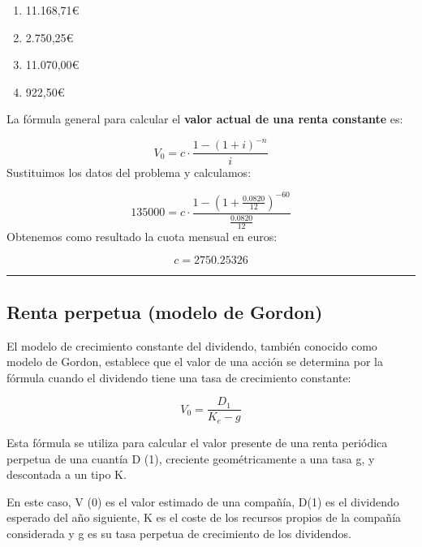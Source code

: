 \documentclass[
  letterpaper,
  DIV=11,
  numbers=noendperiod]{scrreprt}
\begin{document}
\begin{tcolorbox}
\begin{enumerate}
\def\labelenumi{\alph{enumi}.}
\item
  11.168,71€
\item
  2.750,25€
\item
  11.070,00€
\item
  922,50€
\end{enumerate}

\begin{tcolorbox}[enhanced jigsaw, toprule=.15mm, left=2mm, breakable, opacitybacktitle=0.6, toptitle=1mm, coltitle=black, arc=.35mm, leftrule=.75mm, bottomtitle=1mm, titlerule=0mm, title=\textcolor{quarto-callout-tip-color}{\faLightbulb}\hspace{0.5em}{Solución}, rightrule=.15mm, opacityback=0, bottomrule=.15mm, colback=white, colframe=quarto-callout-tip-color-frame, colbacktitle=quarto-callout-tip-color!10!white]

La fórmula general para calcular el \textbf{valor actual de una renta
constante} es:

\[V_0=c\cdot\frac{1-\left(1+i\right)^{-n}}{i}\] Sustituimos los datos
del problema y calculamos:

\[135000=c\cdot \frac{1-\left(1+\frac{0.0820}{12}\right)^{-60}}{\frac{0.0820}{12}}\]
Obtenemos como resultado la cuota mensual en euros:

\[c=2750.25326\]

\end{tcolorbox}

\begin{center}\rule{0.5\linewidth}{0.5pt}\end{center}

\subsection{Renta perpetua (modelo de
Gordon)}\label{renta-perpetua-modelo-de-gordon-1}

El modelo de crecimiento constante del dividendo, también conocido como
modelo de Gordon, establece que el valor de una acción se determina por
la fórmula cuando el dividendo tiene una tasa de crecimiento constante:

\[V_0 = \frac{D_1}{K_e- g}\]

Esta fórmula se utiliza para calcular el valor presente de una renta
periódica perpetua de una cuantía D (1), creciente geométricamente a una
tasa g, y descontada a un tipo K.

En este caso, V (0) es el valor estimado de una compañía, D(1) es el
dividendo esperado del año siguiente, K es el coste de los recursos
propios de la compañía considerada y g es su tasa perpetua de
crecimiento de los dividendos.


\end{tcolorbox}
\end{document}
